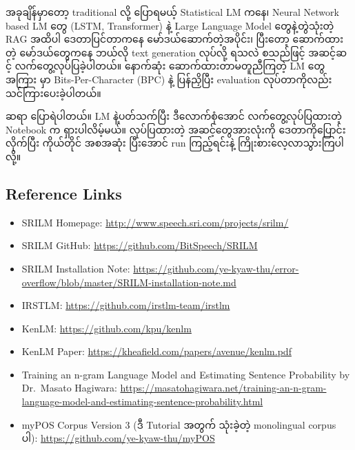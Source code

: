 \documentclass[11pt]{article}
\makeatletter
\providecommand{\tightlist}{%
      \setlength{\itemsep}{0pt}\setlength{\parskip}{0pt}}
\newcommand{\boxspacing}{\kern\kvtcb@left@rule\kern\kvtcb@boxsep}
\newcommand{\prompt}[4]{
        {\ttfamily\llap{{\color{#2}[#3]:\hspace{3pt}#4}}\vspace{-\baselineskip}}
    }
\makeatother
\begin{document}
{\burmesefont အခုချိန်မှာတော့} traditional {\burmesefont လို့} {\burmesefont ပြောရမယ့်} Statistical LM {\burmesefont ကနေ၊} Neural Network
based LM {\burmesefont တွေ} (LSTM, Transformer) {\burmesefont နဲ့} Large Language Model {\burmesefont တွေနဲ့တွဲသုံးတဲ့} RAG {\burmesefont အထိပါ}
{\burmesefont ဒေတာပြင်တာကနေ} {\burmesefont မော်ဒယ်ဆောက်တဲ့အပိုင်း၊} {\burmesefont ပြီးတော့} {\burmesefont ဆောက်ထားတဲ့} {\burmesefont မော်ဒယ်တွေကနေ} {\burmesefont ဘယ်လို} text
generation {\burmesefont လုပ်လို့} {\burmesefont ရသလဲ} {\burmesefont စသည်ဖြင့်} {\burmesefont အဆင့်ဆင့်} {\burmesefont လက်တွေ့လုပ်ပြခဲ့ပါတယ်။} {\burmesefont နောက်ဆုံး} {\burmesefont ဆောက်ထားတာမတူညီကြတဲ့} LM
{\burmesefont တွေအကြား} {\burmesefont မှာ} Bits-Per-Character (BPC) {\burmesefont နဲ့} {\burmesefont ပြန်ညှိပြီး} evaluation {\burmesefont လုပ်တာကိုလည်း}
{\burmesefont သင်ကြားပေးခဲ့ပါတယ်။}

{\burmesefont ဆရာ} {\burmesefont ပြောရဲပါတယ်။} LM {\burmesefont နဲ့ပတ်သက်ပြီး} {\burmesefont ဒီလောက်စုံအောင်} {\burmesefont လက်တွေ့လုပ်ပြထားတဲ့} Notebook {\burmesefont က} {\burmesefont ရှားပါလိမ့်မယ်။}
{\burmesefont လုပ်ပြထားတဲ့} {\burmesefont အဆင့်တွေအားလုံးကို} {\burmesefont ဒေတာကိုပြောင်းလိုက်ပြီး} {\burmesefont ကိုယ်တိုင်} {\burmesefont အစအဆုံး} {\burmesefont ပြီးအောင်} run {\burmesefont ကြည့်ရင်းနဲ့}
{\burmesefont ကြိုးစားလေ့လာသွားကြပါလို့။}

    \hypertarget{reference-links}{%
\subsection{Reference Links}\label{reference-links}}

\begin{itemize}
\tightlist
\item
  SRILM Homepage: \url{http://www.speech.sri.com/projects/srilm/}
\item
  SRILM GitHub: \url{https://github.com/BitSpeech/SRILM}
\item
  SRILM Installation Note:
  \url{https://github.com/ye-kyaw-thu/error-overflow/blob/master/SRILM-installation-note.md}
\item
  IRSTLM: \url{https://github.com/irstlm-team/irstlm}
\item
  KenLM: \url{https://github.com/kpu/kenlm}
\item
  KenLM Paper: \url{https://kheafield.com/papers/avenue/kenlm.pdf}
\item
  Training an n-gram Language Model and Estimating Sentence Probability
  by Dr.~Masato Hagiwara:
  \url{https://masatohagiwara.net/training-an-n-gram-language-model-and-estimating-sentence-probability.html}
\item
  myPOS Corpus Version 3 ({\burmesefont ဒီ} Tutorial {\burmesefont အတွက်} {\burmesefont သုံးခဲ့တဲ့} monolingual corpus {\burmesefont ပါ}):
  \url{https://github.com/ye-kyaw-thu/myPOS}
\end{itemize}

    \begin{tcolorbox}[breakable, size=fbox, boxrule=1pt, pad at break*=1mm,colback=cellbackground, colframe=cellborder]
\prompt{In}{incolor}{ }{\boxspacing}
\begin{Verbatim}[commandchars=\\\{\}]

\end{Verbatim}
\end{tcolorbox}


    
    
    
\end{document}
